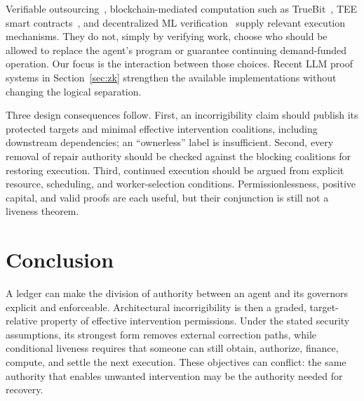 \documentclass[10pt,letterpaper]{article}
\begin{document}
Verifiable outsourcing~\citep{gennaro2010}, blockchain-mediated computation such as TrueBit~\citep{truebit2017}, TEE smart contracts~\citep{ekiden2019}, and decentralized ML verification~\citep{verde2025} supply relevant execution mechanisms. They do not, simply by verifying work, choose who should be allowed to replace the agent's program or guarantee continuing demand-funded operation. Our focus is the interaction between those choices. Recent LLM proof systems in Section~\ref{sec:zk} strengthen the available implementations without changing the logical separation.

Three design consequences follow. First, an incorrigibility claim should publish its protected targets and minimal effective intervention coalitions, including downstream dependencies; an ``ownerless'' label is insufficient. Second, every removal of repair authority should be checked against the blocking coalitions for restoring execution. Third, continued execution should be argued from explicit resource, scheduling, and worker-selection conditions. Permissionlessness, positive capital, and valid proofs are each useful, but their conjunction is still not a liveness theorem.

\section{Conclusion}
A ledger can make the division of authority between an agent and its governors explicit and enforceable. Architectural incorrigibility is then a graded, target-relative property of effective intervention permissions. Under the stated security assumptions, its strongest form removes external correction paths, while conditional liveness requires that someone can still obtain, authorize, finance, compute, and settle the next execution. These objectives can conflict: the same authority that enables unwanted intervention may be the authority needed for recovery.

\begingroup
\small
\raggedright
{}


\endgroup
\end{document}
